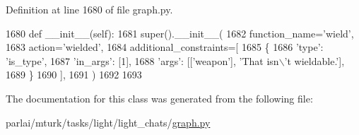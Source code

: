 Definition at line 1680 of file graph.\+py.


\begin{DoxyCode}
1680     \textcolor{keyword}{def }\_\_init\_\_(self):
1681         super().\_\_init\_\_(
1682             function\_name=\textcolor{stringliteral}{'wield'},
1683             action=\textcolor{stringliteral}{'wielded'},
1684             additional\_constraints=[
1685                 \{
1686                     \textcolor{stringliteral}{'type'}: \textcolor{stringliteral}{'is\_type'},
1687                     \textcolor{stringliteral}{'in\_args'}: [1],
1688                     \textcolor{stringliteral}{'args'}: [[\textcolor{stringliteral}{'weapon'}], \textcolor{stringliteral}{'That isn\(\backslash\)'t wieldable.'}],
1689                 \}
1690             ],
1691         )
1692 
1693 
\end{DoxyCode}


The documentation for this class was generated from the following file\+:\begin{DoxyCompactItemize}
\item 
parlai/mturk/tasks/light/light\+\_\+chats/\hyperlink{parlai_2mturk_2tasks_2light_2light__chats_2graph_8py}{graph.\+py}\end{DoxyCompactItemize}
